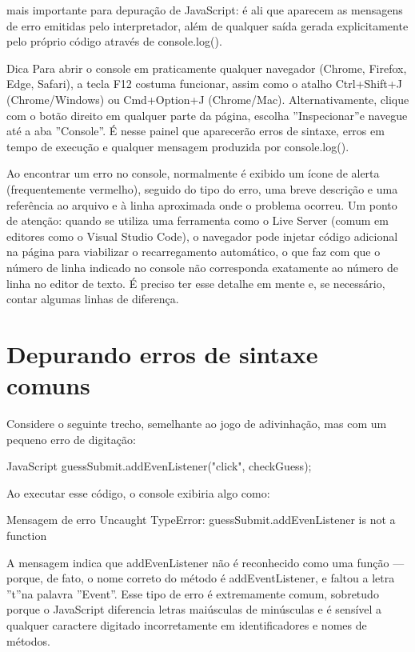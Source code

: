 mais importante para depuração de JavaScript: é ali que aparecem as mensagens de erro emitidas pelo interpretador, além de qualquer saída gerada explicitamente pelo próprio código através de console.log().

\begin{infobox}{Dica}
Para abrir o console em praticamente qualquer navegador (Chrome, Firefox, Edge, Safari), a tecla F12 costuma funcionar, assim como o atalho Ctrl+Shift+J (Chrome/Windows) ou Cmd+Option+J (Chrome/Mac). Alternativamente, clique com o botão direito em qualquer parte da página, escolha ”Inspecionar”e navegue até a aba ”Console”. É nesse painel que aparecerão erros de sintaxe, erros em tempo de execução e qualquer mensagem produzida por console.log().
\end{infobox}

Ao encontrar um erro no console, normalmente é exibido um ícone de alerta (frequentemente vermelho), seguido do tipo do erro, uma breve descrição e uma referência ao arquivo e à linha aproximada onde o problema ocorreu. Um ponto de atenção: quando se utiliza uma ferramenta como o Live Server (comum em editores como o Visual Studio Code), o navegador pode injetar código adicional na página para viabilizar o recarregamento automático, o que faz com que o número de linha indicado no console não corresponda exatamente ao número de linha no editor de texto. É preciso ter esse detalhe em mente e, se necessário, contar algumas linhas de diferença.

\section{Depurando erros de sintaxe comuns}

Considere o seguinte trecho, semelhante ao jogo de adivinhação, mas com um pequeno erro de digitação:

\begin{codebox}{JavaScript}
 guessSubmit.addEvenListener("click", checkGuess);
\end{codebox}

Ao executar esse código, o console exibiria algo como:

\begin{infobox}{Mensagem de erro}
Uncaught TypeError: guessSubmit.addEvenListener is not a function
\end{infobox}

A mensagem indica que addEvenListener não é reconhecido como uma função — porque, de fato, o nome correto do método é addEventListener, e faltou a letra ”t”na palavra ”Event”. Esse tipo de erro é extremamente comum, sobretudo porque o JavaScript diferencia letras maiúsculas de minúsculas e é sensível a qualquer caractere digitado incorretamente em identificadores e nomes de métodos.

